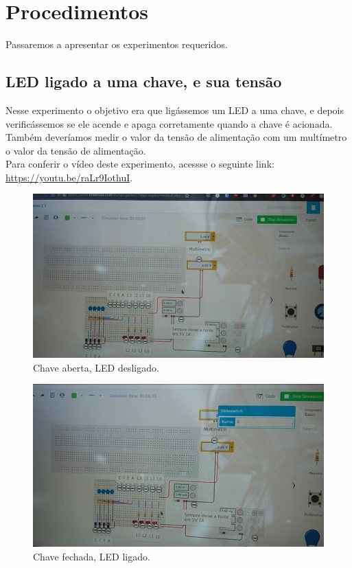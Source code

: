 \documentclass[12pt]{article}
\begin{document}
\section{Procedimentos}
\label{sec:Procedimentos}

Passaremos a apresentar os experimentos requeridos.

\subsection{LED ligado a uma chave, e sua tensão}
\label{sec:led_chave}

Nesse experimento o objetivo era que ligássemos um LED a uma chave, e depois
verificássemos se ele acende e apaga corretamente quando a chave é acionada.
Também deveríamos medir o valor da tensão de alimentação com um multímetro o
valor da tensão de alimentação.\\
Para conferir o vídeo deste experimento, acessse o seguinte link:
\href{https://youtu.be/raLr9IothuI}{https://youtu.be/raLr9IothuI}.

\begin{figure}[H]
    \centering
    \includegraphics[width=.9\textwidth]{exp1_2.1_f1.png}
    \caption{Chave aberta, LED desligado.}
    \label{fig:exp1_2.1_f1}
\end{figure}

\begin{figure}[H]
    \centering
    \includegraphics[width=.9\textwidth]{exp1_2.1_f2.png}
    \caption{Chave fechada, LED ligado.}
    \label{fig:exp1_2.1_f2}
\end{figure}
\end{document}
